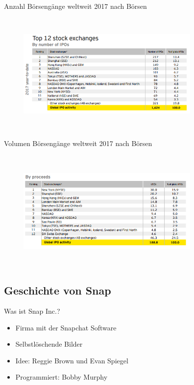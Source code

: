 \documentclass{beamer}
\begin{document}
\begin{frame} {Anzahl Börsengänge weltweit 2017 nach Börsen}
\begin{figure}
	\centering
	\includegraphics[width=9cm, height=6cm]{anzIPOs2017.PNG}
\end{figure}
\end{frame}

\begin{frame} {Volumen Börsengänge weltweit 2017 nach Börsen}
\begin{figure}
	\centering
	\includegraphics[width=9cm, height=6cm]{IPOsExchangeProceeds.PNG}
\end{figure}
\end{frame}





\subsection{Geschichte von Snap}
\begin{frame} {Was ist Snap Inc.?}
\begin{itemize}
\item Firma mit der Snapchat Software 
\item  Selbstlöschende Bilder
\item  Idee: Reggie Brown und Evan Spiegel
\item  Programmiert: Bobby Murphy
\end{itemize}
\end{frame}
\end{document}
